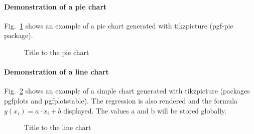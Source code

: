 \paragraph{Demonstration of a pie chart}
Fig.~\ref{fig:PieChart} shows an example of a pie chart generated with tikzpicture (pgf-pie package).

\begin{figure}
	\centering
	\caption{\label{fig:PieChart}Title to the pie chart}
\end{figure}

\paragraph{Demonstration of a line chart}
Fig.~\ref{fig:LineChart} shows an example of a simple chart generated with tikzpicture (packages pgfplots and pgfplotstable). 
The regression is also rendered and the formula $ y(x_i) = a \cdot x_i + b$ displayed. The values a and b will be stored globally.

\begin{figure}
	\centering
	\caption{\label{fig:LineChart}Title to the line chart}
\end{figure}

